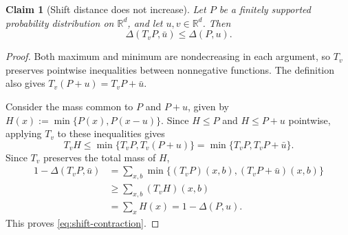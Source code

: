 \documentclass{article}
\newtheorem{claim}[theorem]{Claim}
\newcommand{\R}{\mathbb{R}}
\newcommand{\SDS}[2]{\Delta(#1,#2)}
\begin{document}
\begin{claim}[Shift distance does not increase]
\label{claim:shift-contraction}
Let $P$ be a finitely supported probability distribution on
$\R^d$, and let $u,v\in\R^d$. Then
\begin{equation}
\label{eq:shift-contraction}
\SDS{T_vP}{\bar u}\le\SDS{P}{u}.
\end{equation}
\end{claim}

\begin{proof}
Both maximum and minimum are nondecreasing in each argument,
so $T_v$ preserves pointwise inequalities between nonnegative
functions. The definition also gives
$T_v(P+u)=T_vP+\bar u$.

Consider the mass common to $P$ and $P+u$,
given by $H(x):=\min\{P(x),P(x-u)\}$.
Since $H\le P$ and $H\le P+u$ pointwise, applying $T_v$ to
these inequalities gives
\[
T_vH\le\min\{T_vP,T_v(P+u)\}
=\min\{T_vP,T_vP+\bar u\}.
\]
Since $T_v$ preserves the total mass of $H$,
\[
\begin{aligned}
1-\SDS{T_vP}{\bar u}
&=\sum_{x,b}\min\{(T_vP)(x,b),(T_vP+\bar u)(x,b)\}\\
&\ge\sum_{x,b}(T_vH)(x,b)\\
&=\sum_xH(x)
=1-\SDS{P}{u}.
\end{aligned}
\]
This proves \eqref{eq:shift-contraction}.
\end{proof}
\end{document}
